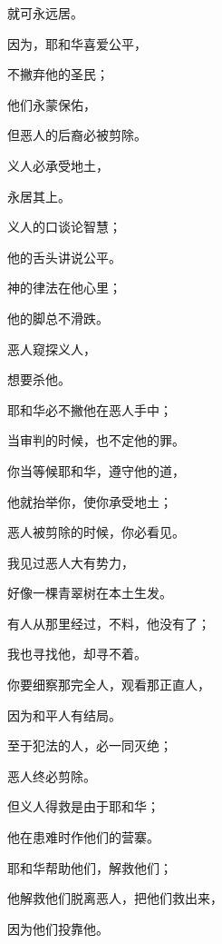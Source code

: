 {\par }{\Q 就可永远{}居。
\par }{\Q {}因为，耶和华喜爱公平，
\par }{\Q 不撇弃他的圣民；
\par }{\Q 他们永蒙保佑，
\par }{\Q 但恶人的后裔必被剪除。
\par }{\Q {}义人必承受地土，
\par }{\Q 永居其上。
\par }{\BB \par }{\Q {}义人的口谈论智慧；
\par }{\Q 他的舌头讲说公平。
\par }{\Q {}神的律法在他心里；
\par }{\Q 他的脚总不滑跌。
\par }{\BB \par }{\Q {}恶人窥探义人，
\par }{\Q 想要杀他。
\par }{\Q {}耶和华必不撇他在恶人手中；
\par }{\Q 当审判的时候，也不定他的罪。
\par }{\BB \par }{\Q {}你当等候耶和华，遵守他的道，
\par }{\Q 他就抬举你，使你承受地土；
\par }{\Q 恶人被剪除的时候，你必看见。
\par }{\BB \par }{\Q {}我见过恶人大有势力，
\par }{\Q 好像一棵青翠树在本土生发。
\par }{\Q {}有人从那里经过，不料，他没有了；
\par }{\Q 我也寻找他，却寻不着。
\par }{\BB \par }{\Q {}你要细察那完全人，观看那正直人，
\par }{\Q 因为和平人有{}结局。
\par }{\Q {}至于犯法的人，必一同灭绝；
\par }{\Q 恶人终必剪除。
\par }{\BB \par }{\Q {}但义人得救是由于耶和华；
\par }{\Q 他在患难时作他们的营寨。
\par }{\Q {}耶和华帮助他们，解救他们；
\par }{\Q 他解救他们脱离恶人，把他们救出来，
\par }{\Q 因为他们投靠他。

}
